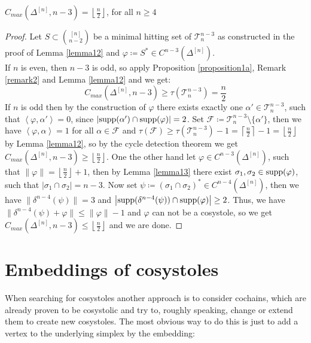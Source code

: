 \begin{thm}
\(C_{max}(\Delta^{[n]},n-3)=\left\lfloor\frac{n}{2}\right\rfloor\), for all \(n\geq 4\)
\begin{proof}
Let \(S\subset\binom{[n]}{n-2}\) be a minimal hitting set of \(\mathcal{T}_n^{n-3}\) as constructed in the proof of Lemma \ref{lemma12} and \(\varphi\coloneqq S^*\in C^{n-3}(\Delta^{[n]})\).\\
If \(n\) is even, then \(n-3\) is odd, so apply Proposition \ref{proposition1a}, Remark \ref{remark2} and Lemma \ref{lemma12} and we get:
\[
C_{max}(\Delta^{[n]},n-3)\geq\tau(\mathcal{T}_n^{n-3})=\frac{n}{2}
\]
If \(n\) is odd then by the construction of \(\varphi\) there exists exactly one \(\alpha'\in\mathcal{T}_n^{n-3}\), such that \(\left\langle\varphi,\alpha'\right\rangle=0\), since \(\left|\mathrm{supp}(\alpha')\cap \mathrm{supp}(\varphi)\right|=2\). Set \(\mathcal{F}\coloneqq \mathcal{T}_n^{n-3}\setminus\{\alpha'\}\), then we have \(\left\langle\varphi,\alpha\right\rangle=1\) for all \(\alpha\in\mathcal{F}\) and \(\tau(\mathcal{F})\geq\tau(\mathcal{T}_n^{n-3})-1=\left\lceil\frac{n}{2}\right\rceil-1=\left\lfloor\frac{n}{2}\right\rfloor\) by Lemma \ref{lemma12}, so by the cycle detection theorem we get \(C_{max}(\Delta^{[n]},n-3)\geq\left\lfloor\frac{n}{2}\right\rfloor\). One the other hand let \(\varphi\in C^{n-3}(\Delta^{[n]})\), such that \(\|\varphi\|=\left\lfloor\frac{n}{2}\right\rfloor+1\), then by Lemma \ref{lemma13} there exist \(\sigma_1,\sigma_2\in \mathrm{supp}(\varphi)\), such that \(\left|\sigma_1\cap\sigma_2\right|=n-3\). Now set \(\psi\coloneqq (\sigma_1\cap\sigma_2)^*\in C^{n-4}(\Delta^{[n]})\), then we have \(\|\delta^{n-4}(\psi)\|=3\) and \(\left|\mathrm{supp}(\delta^{n-4}(\psi))\cap \mathrm{supp}(\varphi)\right|\geq 2\). Thus, we have \(\|\delta^{n-4}(\psi)+\varphi\|\leq\|\varphi\|-1\) and \(\varphi\) can not be a cosystole, so we get \(C_{max}(\Delta^{[n]},n-3)\leq\left\lfloor\frac{n}{2}\right\rfloor\) and we are done.
\end{proof}
\end{thm}

\section{Embeddings of cosystoles}

When searching for cosystoles another approach is to consider cochains, which are already proven to be cosystolic and try to, roughly speaking, change or extend them to create new cosystoles. The most obvious way to do this is just to add a vertex to the underlying simplex by the embedding:


